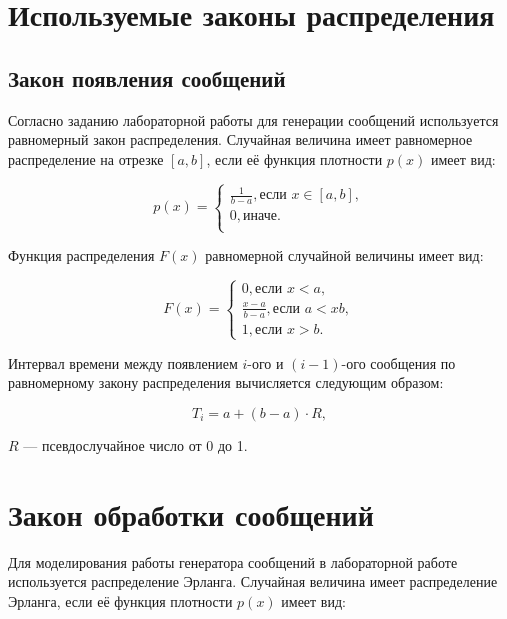 \section*{Используемые законы распределения}

\subsection*{Закон появления сообщений}

Согласно заданию лабораторной работы для генерации сообщений используется равномерный закон распределения.
Случайная величина имеет равномерное распределение на отрезке $[a, b]$, если её функция плотности $p(x)$ имеет вид:

\begin{equation}
	\label{for:equal-1}
    p(x) = 
    \begin{cases}
        \frac{1}{b - a}, \text{если } x \in [a, b],\\
        0, \text{иначе.} \\
    \end{cases}
\end{equation}

Функция распределения $F(x)$ равномерной случайной величины имеет вид:

\begin{equation}
	\label{for:equal-2}
    F(x) = 
    \begin{cases}
    	0, \text{если } x  < a, \\
        \frac{x - a}{b - a}, \text{если } a < x  b,\\
        1, \text{если } x > b. 
    \end{cases}
\end{equation}

Интервал времени между появлением $i$-ого и $(i - 1)$-ого сообщения по равномерному закону распределения вычисляется следующим образом:

\begin{equation}
	T_{i} = a + (b - a) \cdot R,
\end{equation}

 $R$ --- псевдослучайное число от 0 до 1.

\section*{Закон обработки сообщений}

Для моделирования работы генератора сообщений в лабораторной работе используется распределение Эрланга. 
Случайная величина имеет распределение Эрланга, если её функция плотности $p(x)$ имеет вид:

